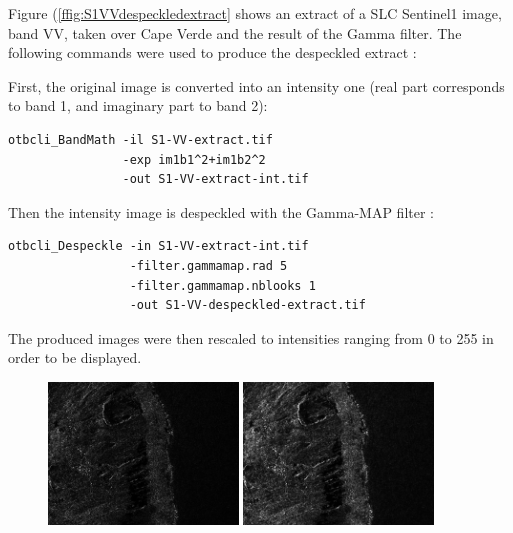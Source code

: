 Figure (\ref{ffig:S1VVdespeckledextract} shows an extract of a SLC Sentinel1
image, band VV, taken over Cape Verde and the result of the Gamma filter. The
following commands were used to produce the despeckled extract :

First, the original image is converted into an intensity one (real part
corresponds to band 1, and imaginary part to band 2):

\begin{verbatim} 
otbcli_BandMath -il S1-VV-extract.tif 
                -exp im1b1^2+im1b2^2 
                -out S1-VV-extract-int.tif 
\end{verbatim}

Then the intensity image is despeckled with the Gamma-MAP filter :

\begin{verbatim} 
otbcli_Despeckle -in S1-VV-extract-int.tif 
                 -filter.gammamap.rad 5
                 -filter.gammamap.nblooks 1 
                 -out S1-VV-despeckled-extract.tif 
\end{verbatim}

The produced images were then rescaled to intensities ranging from 0 to 255 in
order to be displayed.

\begin{figure}[!h]
  \center
  \includegraphics[width=0.45\textwidth]{../Art/SARImages/S1-VV-extract-int.png}
  \includegraphics[width=0.45\textwidth]{../Art/SARImages/S1-VV-despeckled-extract.png}
  \label{fig:S1VVdespeckledextract}
\end{figure}

